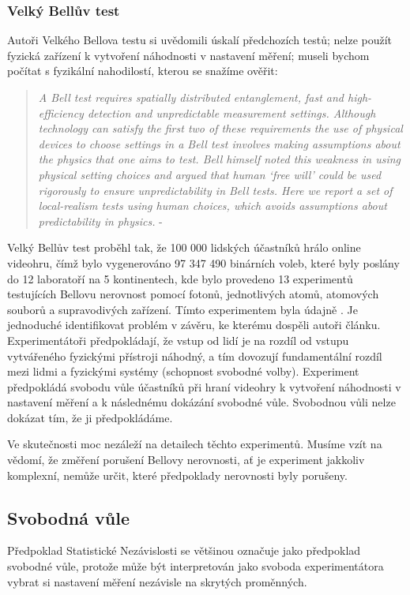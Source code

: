 \subsubsection{Velký Bellův test}
Autoři Velkého Bellova testu si uvědomili úskalí předchozích testů; nelze použít fyzická zařízení k vytvoření náhodnosti v nastavení měření; museli bychom počítat s fyzikální nahodilostí, kterou se snažíme ověřit:
\begin{quote}
    \emph{A Bell test requires spatially distributed entanglement, fast and high-efficiency detection and unpredictable measurement settings. Although technology can satisfy the first two of these requirements the use of physical devices to choose settings in a Bell test involves making assumptions about the physics that one aims to test. Bell himself noted this weakness in using physical setting choices and argued that human ‘free will’ could be used rigorously to ensure unpredictability in Bell tests. Here we report a set of local-realism tests using human choices, which avoids assumptions about predictability in physics.} - \cite{BigBTest}
\end{quote}

Velký Bellův test proběhl tak, že 100 000 lidských účastníků hrálo online videohru, čímž bylo vygenerováno 97 347 490 binárních voleb, které byly poslány do 12 laboratoří na 5 kontinentech, kde bylo provedeno 13 experimentů testujících Bellovu nerovnost pomocí fotonů, jednotlivých atomů, atomových souborů a supravodivých zařízení. Tímto experimentem byla údajně . Je jednoduché identifikovat problém v závěru, ke kterému dospěli autoři článku. Experimentátoři předpokládají, že vstup od lidí je na rozdíl od vstupu vytvářeného fyzickými přístroji náhodný, a tím dovozují fundamentální rozdíl mezi lidmi a fyzickými systémy (schopnost svobodné volby). Experiment předpokládá svobodu vůle účastníků při hraní videohry k vytvoření náhodnosti v nastavení měření a k následnému dokázání svobodné vůle. Svobodnou vůli nelze dokázat tím, že ji předpokládáme.

Ve skutečnosti moc nezáleží na detailech těchto experimentů. Musíme vzít na vědomí, že změření porušení Bellovy nerovnosti, ať je experiment jakkoliv komplexní, nemůže určit, které předpoklady nerovnosti byly porušeny.

\clearpage

\subsection{Svobodná vůle}
Předpoklad Statistické Nezávislosti se většinou označuje jako předpoklad svobodné vůle, protože může být interpretován jako svoboda experimentátora vybrat si nastavení měření nezávisle na skrytých proměnných.

